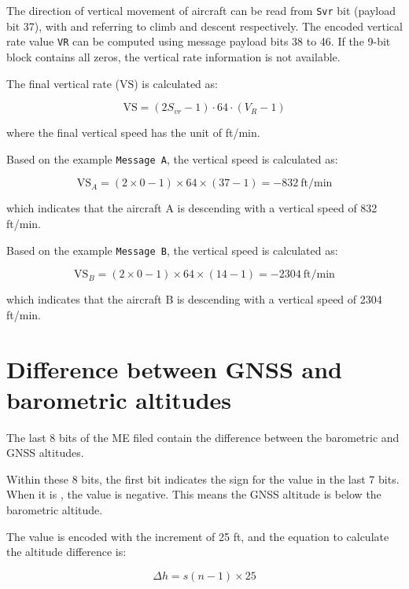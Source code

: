 The direction of vertical movement of aircraft can be read from \texttt{Svr} bit (payload bit 37), with \0 and \1 referring to climb and descent respectively. The encoded vertical rate value \texttt{VR} can be computed using message payload bits 38 to 46. If the 9-bit block contains all zeros, the vertical rate information is not available.

The final vertical rate ($\mathrm{VS}$) is calculated as:

\begin{equation}
  \mathrm{VS} = (2S_{vr} - 1) \cdot 64 \cdot (V_R - 1)
\end{equation}

where the final vertical speed has the unit of ft/min.

Based on the example \texttt{Message A}, the vertical speed is calculated as:

\begin{equation}
  \mathrm{VS}_A = (2 \times 0 - 1) \times 64 \times (37 -1) = -832 ~\text{ft/min}
\end{equation}

which indicates that the aircraft A is descending with a vertical speed of 832 ft/min.

Based on the example \texttt{Message B}, the vertical speed is calculated as:

\begin{equation}
  \mathrm{VS}_B = (2 \times 0 - 1) \times 64 \times (14 -1) = -2304 ~\text{ft/min}
\end{equation}

which indicates that the aircraft B is descending with a vertical speed of 2304 ft/min.


\section{Difference between GNSS and barometric altitudes}

The last 8 bits of the ME filed contain the difference between the barometric and GNSS altitudes. 

Within these 8 bits, the first bit indicates the sign for the value in the last 7 bits. When it is \1, the value is negative. This means the GNSS altitude is below the barometric altitude.

The value is encoded with the increment of 25 ft, and the equation to calculate the altitude difference is:

\begin{equation}
  \Delta h = s (n - 1) \times 25
\end{equation}

